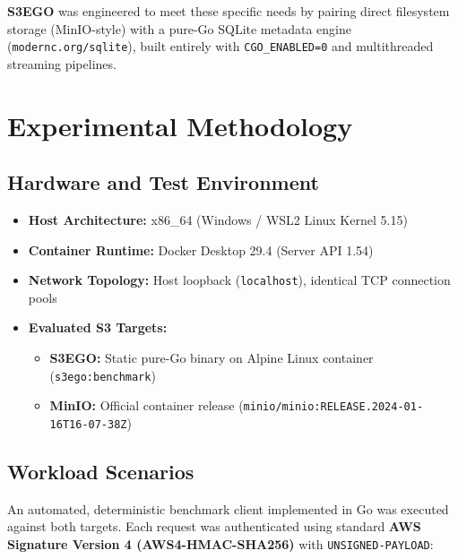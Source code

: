 \documentclass[11pt,a4paper]{article}
\begin{document}
\textbf{S3EGO} was engineered to meet these specific needs by pairing direct filesystem storage (MinIO-style) with a pure-Go SQLite metadata engine (\texttt{modernc.org/sqlite}), built entirely with \texttt{CGO\_ENABLED=0} and multithreaded streaming pipelines.

\section{Experimental Methodology}

\subsection{Hardware and Test Environment}
\begin{itemize}
    \item \textbf{Host Architecture:} x86\_64 (Windows / WSL2 Linux Kernel 5.15)
    \item \textbf{Container Runtime:} Docker Desktop 29.4 (Server API 1.54)
    \item \textbf{Network Topology:} Host loopback (\texttt{localhost}), identical TCP connection pools
    \item \textbf{Evaluated S3 Targets:}
    \begin{itemize}
        \item \textbf{S3EGO:} Static pure-Go binary on Alpine Linux container (\texttt{s3ego:benchmark})
        \item \textbf{MinIO:} Official container release (\texttt{minio/minio:RELEASE.2024-01-16T16-07-38Z})
    \end{itemize}
\end{itemize}

\subsection{Workload Scenarios}
An automated, deterministic benchmark client implemented in Go was executed against both targets. Each request was authenticated using standard \textbf{AWS Signature Version 4 (AWS4-HMAC-SHA256)} with \texttt{UNSIGNED-PAYLOAD}:
\end{document}
